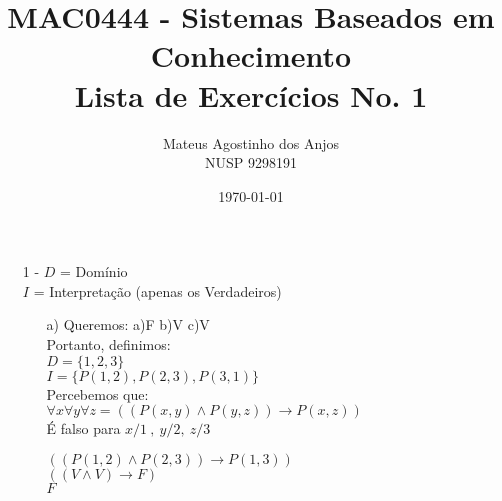 \documentclass[12pt]{article}
\title{MAC0444 - Sistemas Baseados em Conhecimento \\
Lista de Exercícios No. 1
}
\author{Mateus Agostinho dos Anjos\\NUSP 9298191}
\date{\today}
\begin{document}
	\maketitle
	\begin{itemize}
		\item[1 -]
			$D$ = Domínio\\
			$I$ = Interpretação (apenas os Verdadeiros)\\
			\begin{itemize}
				\item[a)]
					Queremos: a)F b)V c)V\\
					Portanto, definimos:\\
					$D = \lbrace 1, 2, 3 \rbrace$\\
					$I = \lbrace P(1, 2), P(2, 3), P(3, 1) \rbrace$\\
					Percebemos que:\\
					$\forall x \forall y \forall z = ((P(x,y) \wedge P(y,z)) \rightarrow P(x, z))$\\
					É falso para $x/1 \ , \ y/2, \ z/3$\\
					\begin{center}	
						$((P(1,2) \wedge P(2,3)) \rightarrow P(1, 3))$\\
						$((V \wedge V) \rightarrow F)$\\
						$F$
					\end{center}
			\end{itemize}
		
	\end{itemize}
\end{document}
